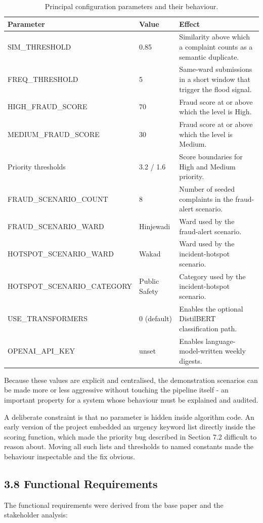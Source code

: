\documentclass[10pt,letterpaper,oneside]{article}\usepackage{geometry}\geometry{top=1in,bottom=1in,left=1in,right=1in,includeheadfoot}\usepackage{xcolor}\definecolor{color@navy}{HTML}{1F3B63}\definecolor{color@grey}{HTML}{404040}\definecolor{color@hdr}{HTML}{F2F4F7}\usepackage{titlesec}\titleformat{\section}  {\normalfont\huge\bfseries\color@navy}  {}{0pt}{\MakeUppercase}\titleformat{\subsection}  {\normalfont\Large\bfseries\color@navy}  {}{0pt}{}\titleformat{\subsubsection}  {\normalfont\large\bfseries\color@navy}  {}{0pt}{}\titlespacing*{\section}{0pt}{14pt}{6pt}\titlespacing*{\subsection}{0pt}{10pt}{4pt}\titlespacing*{\subsubsection}{0pt}{8pt}{3pt}\setlength{\parindent}{0pt}\setlength{\parskip}{0.6em}\parindent=0pt\usepackage{enumitem}\setlist{nosep,leftmargin=*,itemsep=0pt,topsep=2pt,partopsep=0pt}\usepackage{array}\usepackage{booktabs}\usepackage{caption}\captionsetup{font={small,it},labelfont={bf},labelsep=period,  parskip=2pt,skip=4pt,list=no}\captionsetup[table]{labelfont={bf,small,color@navy},name=Table}\usepackage{graphicx}\usepackage{verbatim}\usepackage{ragged2e}\usepackage{longtable}\usepackage{tabularx}\usepackage{multirow}\usepackage{colortbl}\definecolor{rowshade}{HTML}{F2F4F7}\usepackage{tikz}\usetikzlibrary{positioning,calc}\usepackage[hidelinks]{hyperref}\hypersetup{colorlinks=true,linkcolor=color@navy,urlcolor=color@navy}\pagestyle{fancy}\fancyhf{}\renewcommand{\headrulewidth}{0.4pt}\fancyhead[L]{\small\color@navy CivicSense — Project Report}\fancyhead[R]{\small\color@grey October 11, 2026}\fancyfoot[C]{\small\color@grey An Integrated Intelligent Triage Pipelin}\fancyfoot[R]{\small\color@grey Page \thepage}\usepackage{setspace}\setstretch{1.15}\AtBeginDocument{  \hypersetup{pdftitle={An Integrated Intelligent Triage Pipeline for AI-Enhanced Citizen Complaint Management},    pdfauthor={CivicSense Project Team},    pdfsubject={Project Report},    pdfkeywords={smart cities, NLP, complaint management, e-governance},    pdfcreator={CivicSense Project Team}  }}
\begin{document}
\begin{table}[htbp]
\centering
\small
\begin{tabular}{@{}lll@{}}
\toprule
Parameter & Value & Effect \\
\midrule
SIM\_THRESHOLD & 0.85 & Similarity above which a complaint counts as a semantic duplicate. \\
FREQ\_THRESHOLD & 5 & Same-ward submissions in a short window that trigger the flood signal. \\
HIGH\_FRAUD\_SCORE & 70 & Fraud score at or above which the level is High. \\
MEDIUM\_FRAUD\_SCORE & 30 & Fraud score at or above which the level is Medium. \\
Priority thresholds & 3.2 / 1.6 & Score boundaries for High and Medium priority. \\
FRAUD\_SCENARIO\_COUNT & 8 & Number of seeded complaints in the fraud-alert scenario. \\
FRAUD\_SCENARIO\_WARD & Hinjewadi & Ward used by the fraud-alert scenario. \\
HOTSPOT\_SCENARIO\_WARD & Wakad & Ward used by the incident-hotspot scenario. \\
HOTSPOT\_SCENARIO\_CATEGORY & Public Safety & Category used by the incident-hotspot scenario. \\
USE\_TRANSFORMERS & 0 (default) & Enables the optional DistilBERT classification path. \\
OPENAI\_API\_KEY & unset & Enables language-model-written weekly digests. \\
\bottomrule
\end{tabular}
\caption{Principal configuration parameters and their behaviour.}
\end{table}

Because these values are explicit and centralised, the demonstration scenarios can be made more or less aggressive without touching the pipeline itself - an important property for a system whose behaviour must be explained and audited.

A deliberate constraint is that no parameter is hidden inside algorithm code. An early version of the project embedded an urgency keyword list directly inside the scoring function, which made the priority bug described in Section 7.2 difficult to reason about. Moving all such lists and thresholds to named constants made the behaviour inspectable and the fix obvious.

\subsection*{3.8 Functional Requirements}
The functional requirements were derived from the base paper and the stakeholder analysis:
\end{document}
